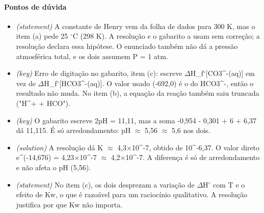 \documentclass{article}%
\begin{document}
\paragraph{Pontos de dúvida}%
\begin{itemize}%
\item%
\textit{(statement)} A constante de Henry vem da folha de dados para 300 K, mas o item (a) pede 25 $^\circ$C (298 K). A resolução e o gabarito a usam sem correção; a resolução declara essa hipótese. O enunciado também não dá a pressão atmosférica total, e os dois assumem P = 1 atm.%
\item%
\textit{(key)} Erro de digitação no gabarito, item (c): escreve $\Delta$H\_f$^\circ${[}CO3\^{}{-}(aq){]} em vez de $\Delta$H\_f$^\circ${[}HCO3\^{}{-}(aq){]}. O valor usado (-692,0) é o do HCO3\^{}{-}, então o resultado não muda. No item (b), a equação da reação também saiu truncada ("H\^{}+ + HCO").%
\item%
\textit{(key)} O gabarito escreve 2pH = 11,11, mas a soma -0,954 - 0,301 + 6 + 6,37 dá 11,115. É só arredondamento: pH $\approx$ 5,56 $\approx$ 5,6 nos dois.%
\item%
\textit{(solution)} A resolução dá K $\approx$ 4,3$\times$10\^{}{-}7, obtido de 10\^{}{-}6,37. O valor direto e\^{}(-14,676) = 4,23$\times$10\^{}{-}7 $\approx$ 4,2$\times$10\^{}{-}7. A diferença é só de arredondamento e não afeta o pH (5,56).%
\item%
\textit{(statement)} No item (c), os dois desprezam a variação de $\Delta$H$^\circ$ com T e o efeito de Kw, o que é razoável para um raciocínio qualitativo. A resolução justifica por que Kw não importa.%
\end{itemize}%
\end{document}
